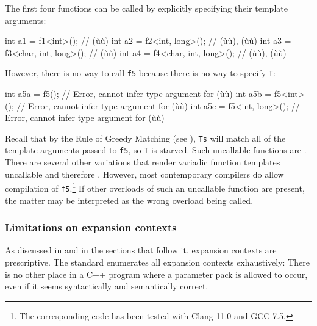 \noindent The first four functions can be called by explicitly specifying their
template arguments:

\begin{emcppslisting}[emcppsbatch=e42]
int a1 = f1<int>();              // (ù{}ù)
int a2 = f2<int, long>();        // (ù{}ù), (ù{}ù)
int a3 = f3<char, int, long>();  // (ù{}ù)
int a4 = f4<char, int, long>();  // (ù{}ù), (ù{}ù)
\end{emcppslisting}
    

\noindent However, there is no way to call \lstinline!f5! because there is no way to
specify \lstinline!T!:

\begin{emcppslisting}
int a5a = f5();             // Error, cannot infer type argument for (ù{}ù)
int a5b = f5<int>();        // Error, cannot infer type argument for (ù{}ù)
int a5c = f5<int, long>();  // Error, cannot infer type argument for (ù{}ù)
\end{emcppslisting}
    

\noindent Recall that by the Rule of Greedy Matching (see ), \lstinline!Ts! will match all of the template
arguments passed to \lstinline!f5!, so \lstinline!T! is starved. Such
uncallable functions are . There are several other
variations that render variadic function templates uncallable and
therefore . However, most contemporary compilers do allow
compilation of \lstinline!f5!.{\cprotect\footnote{The corresponding code
  has been tested with Clang 11.0 and GCC 7.5.}} If other overloads of
such an uncallable function are present, the matter may be interpreted
as the wrong overload being called.

\subsubsection[Limitations on expansion contexts]{Limitations on expansion contexts}\label{limitations-on-expansion-contexts}

As discussed in  and in the sections
that follow it, expansion contexts are prescriptive. The standard
enumerates all expansion contexts exhaustively: There is no other place
in a C++ program where a parameter pack is allowed to occur, even if it
seems syntactically and semantically correct.

